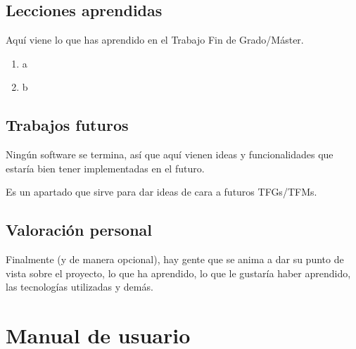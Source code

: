 \documentclass[a4paper, 17pt]{book}
\begin{document}
\section{Lecciones aprendidas}
\label{sec:lecciones_aprendidas}

Aquí viene lo que has aprendido en el Trabajo Fin de Grado/Máster.

\begin{enumerate}
  \item a
  \item b
\end{enumerate}


\section{Trabajos futuros}
\label{sec:trabajos_futuros}

Ningún software se termina, así que aquí vienen ideas y funcionalidades
que estaría bien tener implementadas en el futuro.

Es un apartado que sirve para dar ideas de cara a futuros TFGs/TFMs.


\section{Valoración personal}
\label{sec:valoracion}

Finalmente (y de manera opcional), hay gente que se anima a dar su punto de
vista sobre el proyecto, lo que ha aprendido, lo que le gustaría haber aprendido,
las tecnologías utilizadas y demás.




\cleardoublepage
\appendix
\chapter{Manual de usuario}
\label{app:manual}



\cleardoublepage


\end{document}
